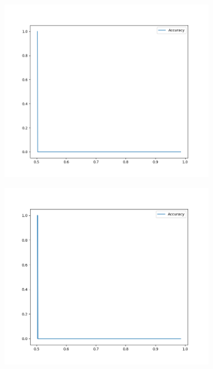 \begin{figure}

    \begin{subfigure}{0.475\linewidth}
        \includegraphics[scale=0.225]{figs/mnist_2_256_prop_0_0.03_samples.png}
        \caption{}
        \label{f:mnist-prop-samples}
    \end{subfigure}
    \begin{subfigure}{0.475\linewidth}
        \includegraphics[scale=0.225]{figs/mnist_2_256_prop_0_0.03_pgd.png}
        \caption{}
        \label{f:mnist-prop-pgd}
    \end{subfigure}


\end{figure}

